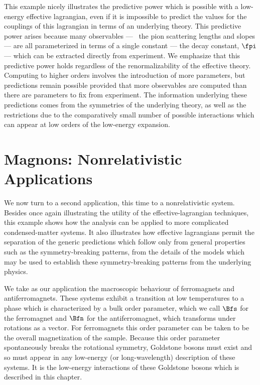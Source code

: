 \documentclass[12pt,epsf]{report}
\begin{document}
This example nicely illustrates the predictive power which
is possible with a low-energy effective lagrangian, even if
it is impossible to predict the values for the couplings of
this lagrangian in terms of an underlying theory. This
predictive power arises because many observables --- \eg\
the pion scattering lengths and slopes --- are all
parameterized in terms of a single constant --- the decay
constant, $\fpi$ --- which can be extracted directly from
experiment. We emphasize that this predictive power holds
regardless of the renormalizability of the effective
theory. Computing to higher orders involves the
introduction of more parameters, but predictions remain
possible provided that more observables are computed than
there are parameters to fix from experiment. The
information underlying these predictions comes from the
symmetries of the underlying theory, as well as the
restrictions due to the comparatively small number of
possible interactions which can appear at low orders of the
low-energy expansion.

\chapter{Magnons: Nonrelativistic Applications}

We now turn to a second application, this time to a
nonrelativistic system. Besides once again illustrating the
utility of the effective-lagrangian techniques, this example
shows how the analysis can be applied to more complicated
condensed-matter systems. It also illustrates how effective
lagrangians permit the separation of the generic predictions
which follow only from general properties such as the
symmetry-breaking patterns, from the details of the models
which may be used to establish these symmetry-breaking
patterns from the underlying physics.

We take as our application the macroscopic behaviour of
ferromagnets and antiferromagnets. These systems exhibit a
transition at low temperatures to a phase which is
characterized by a bulk order parameter, which we call
$\Bfs$ for the ferromagnet and $\Bfn$ for the
antiferromagnet, which transforms under rotations as a
vector. For ferromagnets this order parameter can be taken
to be the overall magnetization of the sample. Because this
order parameter spontaneously breaks the rotational
symmetry, Goldstone bosons must exist and so must appear in
any low-energy (or long-wavelength) description of these
systems. It is the low-energy interactions of these
Goldstone bosons which is described in this chapter.
\end{document}
